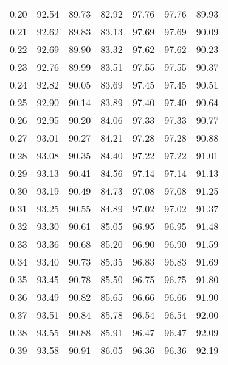 \begin{tabular}{|c|c|c|c|c|c|c|}
      0.20 &     92.54 &     89.73 &      82.92 &   97.76 &      97.76 &         89.93 \\
      0.21 &     92.62 &     89.83 &      83.13 &   97.69 &      97.69 &         90.09 \\
      0.22 &     92.69 &     89.90 &      83.32 &   97.62 &      97.62 &         90.23 \\
      0.23 &     92.76 &     89.99 &      83.51 &   97.55 &      97.55 &         90.37 \\
      0.24 &     92.82 &     90.05 &      83.69 &   97.45 &      97.45 &         90.51 \\
      0.25 &     92.90 &     90.14 &      83.89 &   97.40 &      97.40 &         90.64 \\
      0.26 &     92.95 &     90.20 &      84.06 &   97.33 &      97.33 &         90.77 \\
      0.27 &     93.01 &     90.27 &      84.21 &   97.28 &      97.28 &         90.88 \\
      0.28 &     93.08 &     90.35 &      84.40 &   97.22 &      97.22 &         91.01 \\
      0.29 &     93.13 &     90.41 &      84.56 &   97.14 &      97.14 &         91.13 \\
      0.30 &     93.19 &     90.49 &      84.73 &   97.08 &      97.08 &         91.25 \\
      0.31 &     93.25 &     90.55 &      84.89 &   97.02 &      97.02 &         91.37 \\
      0.32 &     93.30 &     90.61 &      85.05 &   96.95 &      96.95 &         91.48 \\
      0.33 &     93.36 &     90.68 &      85.20 &   96.90 &      96.90 &         91.59 \\
      0.34 &     93.40 &     90.73 &      85.35 &   96.83 &      96.83 &         91.69 \\
      0.35 &     93.45 &     90.78 &      85.50 &   96.75 &      96.75 &         91.80 \\
      0.36 &     93.49 &     90.82 &      85.65 &   96.66 &      96.66 &         91.90 \\
      0.37 &     93.51 &     90.84 &      85.78 &   96.54 &      96.54 &         92.00 \\
      0.38 &     93.55 &     90.88 &      85.91 &   96.47 &      96.47 &         92.09 \\
      0.39 &     93.58 &     90.91 &      86.05 &   96.36 &      96.36 &         92.19 \\

\end{tabular}

